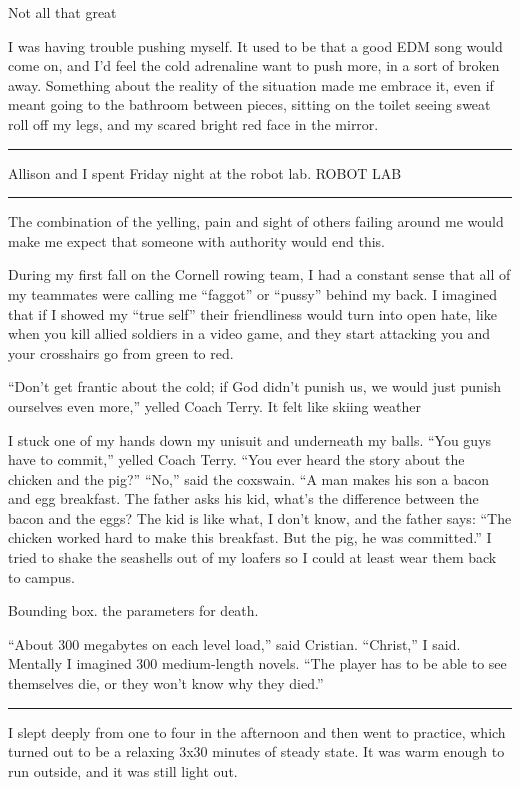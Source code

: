 Not all that great

I was having trouble pushing myself.  It used to be that a good EDM song would
come on, and I'd feel the cold adrenaline want to push more, in a sort of broken
away.  Something about the reality of the situation made me embrace it, even if
meant going to the bathroom between pieces, sitting on the toilet seeing sweat
roll off my legs, and my scared bright red face in the mirror.  


\plainfancybreak{12pt}{2}{* * *}

Allison and I spent Friday night at the robot lab.
ROBOT LAB

\plainfancybreak{12pt}{2}{* * *}

The combination of the yelling, pain and sight of others failing around me would
make me expect that someone with authority would end this.

During my first fall on the Cornell rowing team, I had a constant sense that
all of my teammates were calling me ``faggot'' or ``pussy'' behind my back.  I
imagined that if I showed my ``true self'' their friendliness would turn into
open hate, like when you kill allied soldiers in a video game, and they start
attacking you and your crosshairs go from green to red.  

``Don't get frantic about the cold; if God didn't punish us, we would just
punish ourselves even more,'' yelled Coach Terry.  It felt like skiing weather

I stuck one of my hands down my unisuit and underneath my balls.  ``You guys
have to commit,'' yelled Coach Terry.  ``You ever heard the story about the
chicken and the pig?'' ``No,'' said the coxswain.  ``A man makes his son a bacon
and egg breakfast.  The father asks his kid, what's the difference between the
bacon and the eggs?  The kid is like what, I don't know, and the father says:
``The chicken worked hard to make this breakfast.  But the pig, he was
committed.'' I tried to shake the seashells out of my loafers so I could at
least wear them back to campus. 

Bounding box.  the parameters for death.

``About 300 megabytes on each level load,'' said Cristian.  ``Christ,'' I said.
Mentally I imagined 300 medium-length novels.  ``The player has to be able to
see themselves die, or they won't know why they died.'' 

\plainfancybreak{12pt}{2}{* * *}

I slept deeply from one to four in the afternoon and then went to practice,
which turned out to be a relaxing 3x30 minutes of steady state.  It was warm
enough to run outside, and it was still light out.

